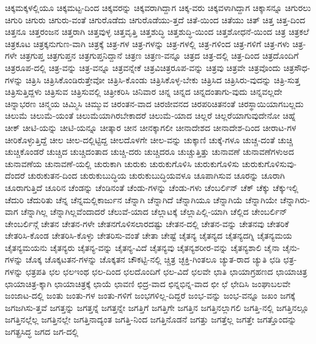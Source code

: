 {ಚಿಕ್ಕಮಕ್ಕಳಲ್ಲಿಯೂ
ಚಿಕ್ಕಮಟ್ಟ-ದಿಂದ
ಚಿಕ್ಕವರನ್ನು
ಚಿಕ್ಕವರಾಗಿದ್ದಾಗ
ಚಿಕ್ಕ-ವರು
ಚಿಕ್ಕವಳಾಗಿದ್ದಾಗ
ಚಿಕ್ಕಾಸನ್ನೂ
ಚಿಗುರಲು
ಚಿಗುರಿ
ಚಿಗುರು
ಚಿಗುರು-ವಂತೆ
ಚಿಗುರೊಡೆದು
ಚಿಗುರೊಡೆಯು-ತ್ತದೆ
ಚಿತೆ-ಯಿಂದ
ಚಿತೆಯು
ಚಿತ್
ಚಿತ್ತ
ಚಿತ್ತ-ದಿಂದ
ಚಿತ್ತನೂ
ಚಿತ್ತರಂಜನ
ಚಿತ್ತರಾಗಿ
ಚಿತ್ತವುಳ್ಳ
ಚಿತ್ತವೃತ್ತಿ
ಚಿತ್ತಶುದ್ಧಿ
ಚಿತ್ತಶುದ್ಧಿ-ಯಿಂದ
ಚಿತ್ತಶೋಧನೆ-ಯಿಂದ
ಚಿತ್ರ
ಚಿತ್ರಕಲೆ
ಚಿತ್ರಕೂಟ
ಚಿತ್ರಕ್ಕನುಗುಣ-ವಾಗಿ
ಚಿತ್ರಕ್ಕೆ
ಚಿತ್ರ-ಗಳ
ಚಿತ್ರ-ಗಳನ್ನು
ಚಿತ್ರ-ಗಳಲ್ಲಿ
ಚಿತ್ರ-ಗಳಿಂದ
ಚಿತ್ರ-ಗಳಿಗೆ
ಚಿತ್ರ-ಗಳು
ಚಿತ್ರ-ಗಳೇ
ಚಿತ್ರಗುಪ್ತ
ಚಿತ್ರಗುಪ್ತನ
ಚಿತ್ರಗುಪ್ತನಿದ್ದಾನೆ
ಚಿತ್ರಣ
ಚಿತ್ರಣ-ವನ್ನೂ
ಚಿತ್ರದ
ಚಿತ್ರ-ದಲ್ಲಿ
ಚಿತ್ರ-ದಿಂದ
ಚಿತ್ರದೊಂದಿಗೆ
ಚಿತ್ರರೂಪ-ದಲ್ಲಿ
ಚಿತ್ರ-ವನ್ನು
ಚಿತ್ರ-ವನ್ನೂ
ಚಿತ್ರವನ್ನೇಕೆ
ಚಿತ್ರವಿಚಿತ್ರರೂಪ-ವನ್ನು
ಚಿತ್ರವು
ಚಿತ್ರವೇ
ಚಿತ್ರವೊಂದು
ಚಿತ್ರಸೌಧ-ಗಳನ್ನು
ಚಿತ್ರಿಸಿ
ಚಿತ್ರಿಸಿಕೊಂಡಿರುತ್ತೇವೋ
ಚಿತ್ರಿಸಿ-ಕೊಂಡು
ಚಿತ್ರಿಸಿಕೊಳ್ಳ-ಬೇಕು
ಚಿತ್ರಿಸಿದ
ಚಿತ್ರಿಸಿರು-ವುದನ್ನು
ಚಿತ್ರಿ-ಸುತ್ತ
ಚಿತ್ರಿಸುತ್ತಿದ್ದಳು
ಚಿತ್ರಿಸುವ
ಚಿತ್ರಿಸುವಲ್ಲಿ
ಚಿತ್ರೀಕರಿಸಿ
ಚಿನಿವಾರ
ಚಿನ್ನ
ಚಿನ್ನದ
ಚಿನ್ನದಂತಾಗು-ವುದು
ಚಿನ್ನವಲ್ಲದೇ
ಚಿನ್ನಾಭರಣ
ಚಿನ್ಮಯ
ಚಿಮ್ಮಿಸಿ
ಚಿಮ್ಮುವ
ಚಿರಂತನ-ವಾದ
ಚಿರಜೀವನದ
ಚಿರಪರಿಚಿತನಂತೆ
ಚಿರಸ್ಥಾಯಿಯಾಗಬಲ್ಲದು
ಚಿಲುಮೆ
ಚಿಲುಮೆ-ಯಂತೆ
ಚಿಲುಮೆಯಾಗಿರಬೇಕಾದರೆ
ಚಿಲುಮೆ-ಯಾದ
ಚಿಲ್ಲರೆ
ಚಿಲ್ಲರೆಯಾಗುವುದೇನೋ
ಚಿಹ್ನೆ
ಚೀಕ್
ಚೀಟಿ-ಯನ್ನು
ಚೀಟಿ-ಯನ್ನೂ
ಚೀತ್ಕಾರ
ಚೀನ
ಚೀನಕ್ಕಾಗಲೀ
ಚೀನಾದೇಶದ
ಚೀನಾದೇಶ-ದಿಂದ
ಚೀರಾಟ-ಗಳ
ಚೀರಿಕೊಳ್ಳುತ್ತಿದ್ದೆ
ಚೀಲ
ಚೀಲ-ದಲ್ಲಿಟ್ಟಿದ್ದ
ಚೀಲದೊಳಗೇ
ಚೀಲ-ವನ್ನು
ಚುಕ್ಕಾಣಿ
ಚುಕ್ಕೆ-ಗಳೂ
ಚುಚ್ಚ-ದಂತೆ
ಚುಚ್ಚಿ
ಚುಚ್ಚಿಕೊಂಡರೆ
ಚುಚ್ಚಿದ
ಚುಚ್ಚಿದಂತಾದ
ಚುಚ್ಚಿ-ದರು
ಚುಚ್ಚಿದರೂ
ಚುಚ್ಚುತ್ತಿತ್ತು
ಚುನಾವಣೆ
ಚುನಾವಣೆಗಳುಅದ
ಚುನಾವಣೆಯ
ಚುನಾವಣೆ-ಯಲ್ಲಿ
ಚುರುಕಾಗಿ
ಚುರುಕು
ಚುರುಕುಗೊಳಿಸಿ
ಚುರುಕುಗೊಳಿಸು
ಚುರುಕುಗೊಳಿಸುವು-ದೆಂದರೆ
ಚುರುಕುತನ-ದಿಂದ
ಚುರುಕುಬುದ್ಧಿಯ
ಚುರುಕುಬುದ್ಧಿಯವಳೂ
ಚೂಪಾಗಿಸುವ
ಚೂರನ್ನು
ಚೂರಾಗಿ
ಚೂರಾಗುತ್ತಿದೆ
ಚೂರಿನ
ಚೆಂಡನ್ನು
ಚೆಂಡಿನಂತೆ
ಚೆಂಡು-ಗಳನ್ನು
ಚೆಂಡು-ಗಳು
ಚೆಂಬರ್ಲಿನ್
ಚೆಕ್
ಚೆಕ್ಕು
ಚೆಕ್ಕುಇಲ್ಲಿ
ಚೆದುರಿ
ಚೆದುರಿತು
ಚೆನ್ನ
ಚೆನ್ನಮಲ್ಲಿಕಾರ್ಜುನ
ಚೆನ್ನಾಗಿ
ಚೆನ್ನಾಗಿದೆ
ಚೆನ್ನಾಗಿಯೂ
ಚೆನ್ನಾಗಿಯೆ
ಚೆನ್ನಾಗಿಯೇ
ಚೆನ್ನಾಗಿರು-ವಾಗ
ಚೆನ್ನಾಗಿಲ್ಲ
ಚೆನ್ನಾಗಿಲ್ಲವೆಂದಾದರೆ
ಚೆಲುವೆ-ಯಾದ
ಚೆಲ್ಲಾಟಕ್ಕೆ
ಚೆಲ್ಲಾಪಿಲ್ಲಿ-ಯಾಗಿ
ಚೆಲ್ಲಿದ
ಚೇಂಬರ್ಲಿನ್
ಚೇಂಬರ್ಲಿನ್ಗೆ
ಚೇತನ
ಚೇತನ-ಗಳೇ
ಚೇತನಗೊಳಿಸಲಾರದಷ್ಟು
ಚೇತನ-ದಲ್ಲಿ
ಚೇತನ-ವನ್ನು
ಚೇತನವು
ಚೇತರಿಕೆ
ಚೇತರಿಸಿ-ಕೊಂಡ
ಚೇತರಿಸಿ-ಕೊಳ್ಳು
ಚೇತರಿಸು-ವಂತೆ
ಚೇತಾ
ಚೇಷ್ಟೆ
ಚೈತನ್ಯ
ಚೈತನ್ಯದ
ಚೈತನ್ಯದಗ್ನಿ
ಚೈತನ್ಯಮಯ
ಚೈತನ್ಯಮಯನು
ಚೈತನ್ಯರು
ಚೈತನ್ಯ-ವನ್ನು
ಚೈತನ್ಯ-ವಿದೆ
ಚೈತನ್ಯವು
ಚೈತನ್ಯಶರೀರ-ವನ್ನು
ಚೈತನ್ಯಶಾಲಿ
ಚೈನಾ
ಚೈನು-ಗಳನ್ನು
ಚೊಕ್ಕ
ಚೊಕ್ಕಟತನ-ಗಳನ್ನು
ಚೊಕ್ಕತನ
ಚೌಕಟ್ಟಿ-ನಲ್ಲಿ
ಚ್ಚಿತ್ರ
ಚ್ಛಕ್ತಿ-ಗಿಂತಲೂ
ಚ್ಯುತ-ರಾದ
ಚ್ಯುತಿ
ಛಡಿ
ಛತ್ರ-ಗಳನ್ನು
ಛತ್ರಪತಿ
ಛಲ
ಛಲಇಂಥ
ಛಲ-ದಿಂದ
ಛಲದೊಂದಿಗೆ
ಛಲ-ವಿದೆ
ಛಲವೇ
ಛಾತಿ
ಛಾಯಾಗ್ರಹಣದ
ಛಾಯಾಚಿತ್ರ
ಛಾಯಾಚಿತ್ರ-ಕ್ಕಾಗಿ
ಛಾಯಾಚಿತ್ರಕ್ಕೆ
ಛಾಯೆ
ಛಾವಣಿ
ಛಿದ್ರ-ವಾದ
ಛಿನ್ನಭಿನ್ನ-ವಾದ
ಛೀ
ಛೆ
ಛೇದಿಸಿ
ಜಂಘಾಬಲವೇ
ಜಂಜಾಟ-ದಲ್ಲಿ
ಜಂತು
ಜಂತು-ಗಳ
ಜಂತು-ಗಳಿಗೆ
ಜಂಭಗಳಿಲ್ಲ-ದಿದ್ದರೆ
ಜಂಭ-ವನ್ನು
ಜಂಭ-ವನ್ನೂ
ಜಖಂ
ಜಗಕ್ಕೆ
ಜಗಜಗಿಸು-ತ್ತವೆ
ಜಗತ್ತನ್ನು
ಜಗತ್ತನ್ನೆ
ಜಗತ್ತನ್ನೇ
ಜಗತ್ತಿಗೆ
ಜಗತ್ತಿಗೇ
ಜಗತ್ತಿನ
ಜಗತ್ತಿನಲ್ಲಾಗಲಿ
ಜಗತ್ತಿ-ನಲ್ಲಿ
ಜಗತ್ತಿನಲ್ಲೂ
ಜಗತ್ತಿನಲ್ಲೆಲ್ಲ
ಜಗತ್ತಿನಲ್ಲೇ
ಜಗತ್ತಿನಾದ್ಯಂತ
ಜಗತ್ತಿ-ನಿಂದ
ಜಗತ್ತಿನೊಡನೆ
ಜಗತ್ತು
ಜಗತ್ತೆಲ್ಲ
ಜಗತ್ತೇ
ಜಗತ್ತೊಂದನ್ನು
ಜಗತ್ಪ್ರಸಿದ್ಧ
ಜಗದ
ಜಗ-ದಲ್ಲಿ
}
